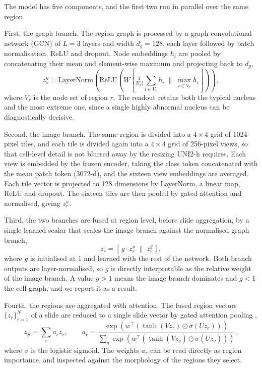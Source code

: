 \documentclass{midl} %
\begin{document}
The model has five components, and the first two run in parallel over the same region.

First, the graph branch. The region graph is processed by a graph convolutional network (GCN)
\citep{kipf2017} of $L=3$ layers and width $d_g=128$, each layer followed by batch
normalisation, ReLU and dropout. Node embeddings $h_i$ are pooled by concatenating their mean
and element-wise maximum and projecting back to $d_g$,
\begin{equation}
\label{eq:region-readout}
z^{g}_{r} = \mathrm{LayerNorm}\!\left( \mathrm{ReLU}\!\left( W \left[ \tfrac{1}{|V_r|}
\textstyle\sum_{i \in V_r} h_i \;\big\|\; \max_{i \in V_r} h_i \right] \right) \right),
\end{equation}
where $V_r$ is the node set of region $r$. The readout retains both the typical nucleus and the
most extreme one, since a single highly abnormal nucleus can be diagnostically decisive.

Second, the image branch. The same region is divided into a $4 \times 4$ grid of 1024-pixel
tiles, and each tile is divided again into a $4 \times 4$ grid of 256-pixel views, so that
cell-level detail is not blurred away by the resizing UNI2-h \citep{chen2024} requires. Each
view is embedded by the frozen encoder, taking the class token concatenated with the mean patch
token (3072-d), and the sixteen view embeddings are averaged. Each tile vector is projected to
128 dimensions by LayerNorm, a linear map, ReLU and dropout. The sixteen tiles are then pooled
by gated attention \citep{ilse2018} and normalised, giving $z^{u}_{r}$.

Third, the two branches are fused at region level, before slide aggregation, by a single
learned scalar that scales the image branch against the normalised graph branch,
\begin{equation}
\label{eq:fusion}
z_{r} = \left[\, g \cdot z^{u}_{r} \;\big\|\; z^{g}_{r} \,\right],
\end{equation}
where $g$ is initialised at 1 and learned with the rest of the network. Both branch outputs are
layer-normalised, so $g$ is directly interpretable as the relative weight of the image branch.
A value $g>1$ means the image branch dominates and $g<1$ the cell graph, and we report it as a
result.

Fourth, the regions are aggregated with attention. The fused region vectors
$\{z_r\}_{r=1}^{N}$ of a slide are reduced to a single slide vector by gated attention pooling
\citep{ilse2018},
\begin{equation}
\label{eq:abmil}
z_{S} = \sum_{r} a_{r} z_{r}, \qquad
a_{r} = \frac{\exp\!\left( w^{\top} \left( \tanh(V z_{r}) \odot \sigma(U z_{r}) \right) \right)}
{\sum_{q} \exp\!\left( w^{\top} \left( \tanh(V z_{q}) \odot \sigma(U z_{q}) \right) \right)},
\end{equation}
where $\sigma$ is the logistic sigmoid. The weights $a_r$ can be read directly as region
importance, and inspected against the morphology of the regions they select.
\end{document}
